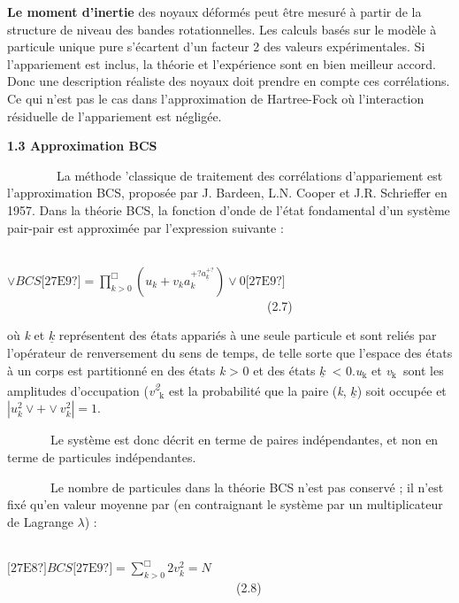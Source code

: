 \documentclass[a4paper]{article}
\providecommand\textsubscript[1]{\ensuremath{{}_{\text{#1}}}}
\begin{document}
\textbf{Le moment d'inertie} des noyaux déformés peut être mesuré à partir de la structure de niveau des bandes
rotationnelles. Les calculs basés sur le modèle à particule unique pure s'écartent d'un facteur 2 des valeurs
expérimentales. Si l'appariement est inclus, la théorie et l'expérience sont en bien meilleur accord. Donc une
description réaliste des noyaux doit prendre en compte ces corrélations. Ce qui n’est pas le cas dans l’approximation
de Hartree-Fock où l’interaction résiduelle de l’appariement est négligée.

\textbf{1.3 Approximation BCS}

\ \ \ \ \ \ \ \ La méthode {\textquotedbl}'classique{\textquotedbl} de traitement des corrélations d'appariement est
l'approximation BCS, proposée par J. Bardeen, L.N. Cooper et J.R. Schrieffer en 1957. Dans la théorie BCS, la fonction
d’onde de l’état fondamental d’un système pair-pair est approximée par l’expression suivante : \ \ 

\ \ \ \ \ \ \ \ \ \ \ \ \ \ \ \ \ \ \ \ \ \ \ \ \ \ \ \ \ \ \ \ \ \ \ \ \ \  $\vee \mathit{BCS}\text{[27E9?]}=\prod
_{k>0}^{\Box }\left(u_k+v_ka_k^{+?a_{\underline k}^{+?}}\right)\vee
0\text{[27E9?]}$\ \ \ \ \ \ \ \ \ \ \ \ \ \ \ \ \ \ \ \ \ \ \ \ \ \ \ \ \ \ \ \ \ \ \ \ \ \ \ \ \ \ (2.7)

où\textit{ k} et $\underline k$ représentent des états appariés à une seule particule et sont reliés par l’opérateur de
renversement du sens de temps, de telle sorte que l’espace des états à un corps est partitionné en des états \textit{k
}{\textgreater} 0 et des états  $\underline k$\ {\textless} 0.\textit{u}\textit{\textsubscript{k}} et
\textit{v}\textit{\textsubscript{k}}\textsubscript{ }sont les amplitudes d’occupation
({\textbar}\textit{v}\textit{\textsuperscript{2}}\textit{\textsubscript{k}}{\textbar} est la probabilité que la paire
(\textit{k}, $\underline k$) soit occupée et $\left|u_k^2\vee +\vee v_k^2\right|=1$.

\ \ \ \ \ \ \ Le système est donc décrit en terme de paires indépendantes, et non en terme de particules indépendantes. 

\ \ \ \ \ \ \ Le nombre de particules dans la théorie BCS n’est pas conservé ; il n’est fixé qu’en valeur moyenne par
(en contraignant le système par un multiplicateur de Lagrange $\lambda $) :

\ \ \ \ \ \ \ \ \ \ \ \ \ \ \ \ \ \ \ \ \ \ \ \ \ \ \ \ \ \ \ \ \ \ \ \ \ \ \ \ \ \ \ \ \ \ 
$\text{[27E8?]}\mathit{BCS}\text{[27E9?]}=\sum _{k>0}^{\Box
}2v_k^2=N$\ \ \ \ \ \ \ \ \ \ \ \ \ \ \ \ \ \ \ \ \ \ \ \ \ \ \ \ \ \ \ \ \ \ \ \ \ (2.8)
\end{document}
